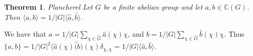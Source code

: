 \documentclass[]{article}
\newtheorem{theorem}{Theorem}
\theoremstyle{definition}
\numberwithin{theorem}{section}
\numberwithin{equation}{section}
\begin{document}
\begin{theorem}{Plancherel}
	Let $G$ be a finite abelian group and let $a, b \in \mathbb{C}(G)$. Then $\langle a, b \rangle = 1/|G| \langle \widehat{a}, \widehat{b} \rangle$. 
\end{theorem}
We have that $a = 1/|G| \sum_{\chi \in \widehat{G}} \widehat{a}(\chi) \chi$, and $b = 1/|G| \sum_{\chi \in \widehat{G}} \widehat{b}(\chi) \chi$. Thus $\lbrace a, b \rbrace = 1/|G|^2 \langle \widehat{a}(\chi) \widehat(b)(\chi) \delta_{\chi, \chi} = 1/|G| \langle \widehat{a}, \widehat{b} \rangle$. 
\end{document}
